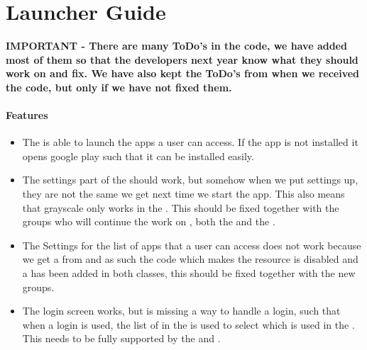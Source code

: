 \chapter{Launcher Guide}\label{WikiLauncher}

\textbf{IMPORTANT - There are many ToDo's in the code, we have added most of
them so that the developers next year know what they should work on and fix. We
have also kept the ToDo's from when we received the code, but only if we have
not fixed them.}

\subsubsection{Features}
\begin{itemize}
  \item The  is able to launch the apps a user can access. If
  the app is not installed it opens google play such that it can be installed easily.
  \item The settings part of the  should work, but somehow when
  we put settings up, they are not the same we get next time we start the app. This
  also means that grayscale only works in the . This
  should be fixed together with the groups who will continue the work on
  , both the  and the .
  \item The Settings for the list of apps that a user can access does not work
  because we get a  from  and as such the code
  which makes the resource  is disabled and a  has
  been added in both classes, this should be fixed together with the new
   groups.
  \item The login screen works, but is missing a way to handle a
   login, such that when a  login is used,
  the list of  in the  is used to select
  which  is used in the . This needs to be fully
  supported by the  and .
\end{itemize}

